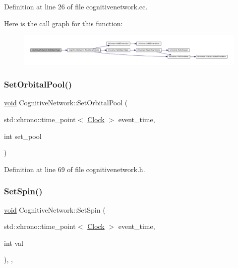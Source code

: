 Definition at line 26 of file cognitivenetwork.\+cc.

Here is the call graph for this function\+:\nopagebreak
\begin{figure}[H]
\begin{center}
\leavevmode
\includegraphics[width=350pt]{class_cognitive_network_ad95a0b25c7f61fc52322938eb13c9e3e_cgraph}
\end{center}
\end{figure}
\mbox{\label{class_cognitive_network_aeee6e2b2eb06b3c55a0f019b6c9cc250}} 
\subsubsection{\texorpdfstring{Set\+Orbital\+Pool()}{SetOrbitalPool()}}
{\footnotesize\ttfamily \mbox{\hyperlink{glad_8h_a950fc91edb4504f62f1c577bf4727c29}{void}} Cognitive\+Network\+::\+Set\+Orbital\+Pool (\begin{DoxyParamCaption}\item[{std\+::chrono\+::time\+\_\+point$<$ \mbox{\hyperlink{universe_8h_a0ef8d951d1ca5ab3cfaf7ab4c7a6fd80}{Clock}} $>$}]{event\+\_\+time,  }\item[{int}]{set\+\_\+pool }\end{DoxyParamCaption})\hspace{0.3cm}{\ttfamily [inline]}}



Definition at line 69 of file cognitivenetwork.\+h.

\mbox{\label{class_cognitive_network_a3fc6d08413bfd4350f94d6f2627eedc7}} 
\subsubsection{\texorpdfstring{Set\+Spin()}{SetSpin()}}
{\footnotesize\ttfamily \mbox{\hyperlink{glad_8h_a950fc91edb4504f62f1c577bf4727c29}{void}} Cognitive\+Network\+::\+Set\+Spin (\begin{DoxyParamCaption}\item[{std\+::chrono\+::time\+\_\+point$<$ \mbox{\hyperlink{universe_8h_a0ef8d951d1ca5ab3cfaf7ab4c7a6fd80}{Clock}} $>$}]{event\+\_\+time,  }\item[{int}]{val }\end{DoxyParamCaption})\hspace{0.3cm}{\ttfamily [inline]}, {\ttfamily [final]}, {\ttfamily [virtual]}}



